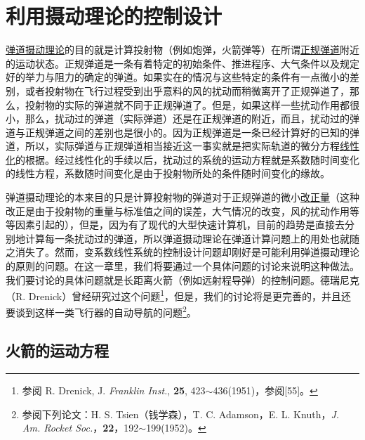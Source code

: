 
\chapter{利用摄动理论的控制设计}


\underline{弹道摄动理论}的目的就是计算投射物（例如炮弹，火箭弹等）在所谓\underline{正规弹道}附近的运动状态。正规弹道是一条有着特定的初始条件、推进程序、大气条件以及规定好的举力与阻力的确定的弹道。如果实在的情况与这些特定的条件有一点微小的差别，或者投射物在飞行过程受到出乎意料的风的扰动而稍微离开了正规弹道了，那么，投射物的实际的弹道就不同于正规弹道了。但是，如果这样一些扰动作用都很小，那么，扰动过的弹道（实际弹道）还是在正规弹道的附近，而且，扰动过的弹道与正规弹道之间的差别也是很小的。因为正规弹道是一条已经计算好的已知的弹道，所以，实际弹道与正规弹道相当接近这一事实就是把实际轨道的微分方程\underline{线性化}的根据。经过线性化的手续以后，扰动过的系统的运动方程就是系数随时间变化的线性方程，系数随时间变化是由于投射物所处的条件随时间变化的缘故。

弹道摄动理论的本来目的只是计算投射物的弹道对于正规弹道的微小\underline{改正量}（这种改正是由于投射物的重量与标准值之间的误差，大气情况的改变，风的扰动作用等等因素引起的），但是，因为有了现代的大型快速计算机，目前的趋势是直接去分别地计算每一条扰动过的弹道，所以弹道摄动理论在弹道计算问题上的用处也就随之消失了。然而，变系数线性系统的控制设计问题却刚好是可能利用弹道摄动理论的原则的问题。在这一章里，我们将要通过一个具体问题的讨论来说明这种做法。我们要讨论的具体问题就是长距离火箭（例如远射程导弹）的控制问题。德瑞尼克（R. Drenick）曾经研究过这个问题\footnote{参阅 R. Drenick, J. \textit{Franklin Inst.}, \textbf{25}, 423$\sim$436(1951)，参阅[55]。}，但是，我们的讨论将是更完善的，并且还要谈到这样一类飞行器的自动导航的问题\footnote{参阅下列论文：H. S. Tsien（钱学森），T. C. Adamson，E. L. Knuth，\textit{J. Am. Rocket Soc.}，\textbf{22}，192$\sim$199(1952)。}。

\section{火箭的运动方程}


